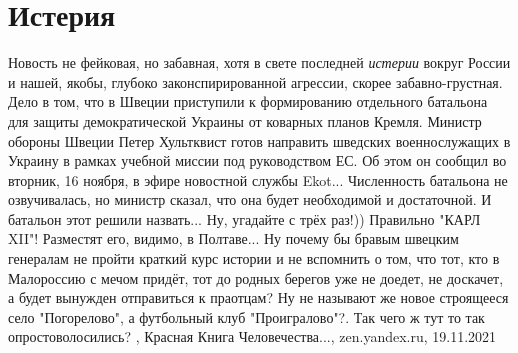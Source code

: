  
 
 
 
 
\chapter{Истерия}
\label{sec:slova.isteria}

Новость не фейковая, но забавная, хотя в свете последней \emph{истерии} вокруг
России и нашей, якобы, глубоко законспирированной агрессии, скорее
забавно-грустная.  Дело в том, что в Швеции приступили к формированию
отдельного батальона для защиты демократической Украины от коварных планов
Кремля. Министр обороны Швеции Петер Хультквист готов направить шведских
военнослужащих в Украину в рамках учебной миссии под руководством ЕС. Об этом
он сообщил во вторник, 16 ноября, в эфире новостной службы Ekot... Численность
батальона не озвучивалась, но министр сказал, что она будет необходимой и
достаточной.  И батальон этот решили назвать... Ну, угадайте с трёх раз!))
Правильно "КАРЛ XII"! Разместят его, видимо, в Полтаве... Ну почему бы бравым
швецким генералам не пройти краткий курс истории и не вспомнить о том, что тот,
кто в Малороссию с мечом придёт, тот до родных берегов уже не доедет, не
доскачет, а будет вынужден отправиться к праотцам? Ну не называют же новое
строящееся село "Погорелово", а футбольный клуб "Проигралово"?. Так чего ж тут
то так опростоволосились?
, Красная Книга Человечества..., zen.yandex.ru, 19.11.2021
